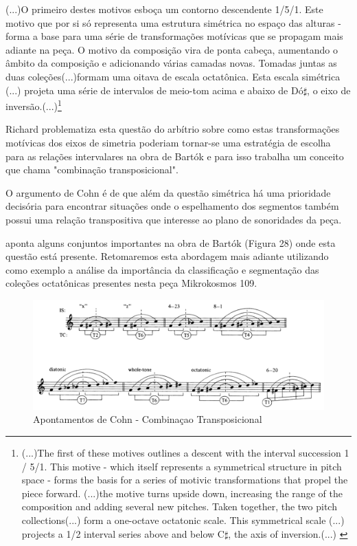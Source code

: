 \documentclass[
	12pt,				%
	openright,			%
	twoside,			%
	a4paper,			%
	english,			%
	french,				%
	spanish,			%
	brazil				%
	]{abntex2}
\begin{document}
\begin{citacao}
(...)O primeiro destes motivos esboça um contorno descendente 1/5/1. Este motivo que por si só representa uma estrutura simétrica no espaço das alturas - forma a base para uma série de transformações motívicas que se propagam mais adiante na peça.
O motivo da composição vira de ponta cabeça, aumentando o âmbito da composição e adicionando várias camadas novas. Tomadas juntas as duas coleções(...)formam uma oitava de escala octatônica. Esta escala simétrica (...) projeta uma série de intervalos de meio-tom acima e abaixo de Dó$\sharp$, o eixo de inversão.(...)\cite[p. 33]{pearsall2004symmetry}\footnote{(...)The first of these motives outlines a descent with the interval
succession 1 / 5/1. This motive - which itself represents a symmetrical structure in pitch space - forms the basis for a series of motivic transformations that propel the piece forward. (...)the motive turns
upside down, increasing the range of the composition and adding several new pitches. Taken together, the two pitch collections(...) form a one-octave octatonic scale. This symmetrical scale (...)
projects a 1/2 interval series above and below C$\sharp$, the axis of inversion.(...) \cite[p. 33]{pearsall2004symmetry}}
\end{citacao}

Richard  problematiza esta questão do arbítrio sobre como estas transformações motívicas dos eixos de simetria poderiam tornar-se uma estratégia de escolha para as relações intervalares na obra de Bartók e para isso trabalha um conceito que chama "combinação transposicional". 

O argumento de Cohn é de que além da questão simétrica há uma prioridade decisória para encontrar situações onde o espelhamento dos segmentos também possui uma relação transpositiva que interesse ao plano de sonoridades da peça.

 aponta alguns conjuntos importantes na obra de Bartók (Figura 28) onde esta questão está presente. Retomaremos esta abordagem mais adiante utilizando como exemplo a análise da importância da classificação e segmentação das coleções octatônicas presentes nesta peça Mikrokosmos 109.\cite{cohn1991bartok}

\begin{figure}[!h]
	\caption{\label{fig_grafico}Apontamentos de Cohn - Combinaçao Transposicional}
	\begin{center}
	    \includegraphics[scale=0.4]{axis/TCCohn.png}
	\end{center}
\end{figure}
\end{document}
